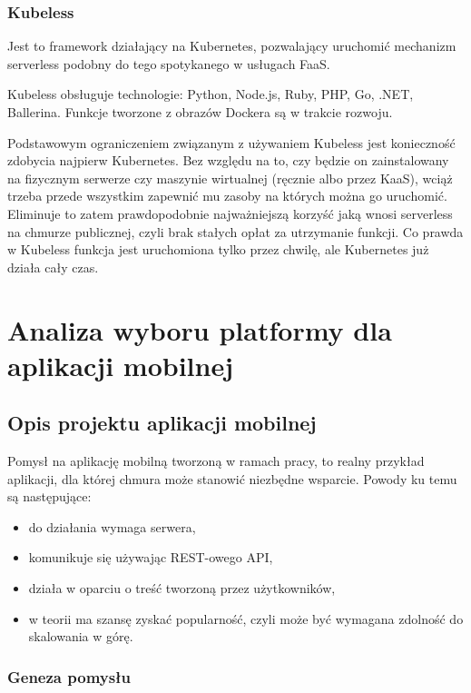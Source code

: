 \documentclass[12pt,a4paper,twoside,titlepage,openright]{book}
\begin{document}
\subsection{Kubeless}

Jest to framework działający na Kubernetes, pozwalający uruchomić mechanizm serverless podobny do tego spotykanego w usługach FaaS. \cite{distributedSystems} 

Kubeless obsługuje technologie: Python, Node.js, Ruby, PHP, Go, .NET, Ballerina. Funkcje tworzone z obrazów Dockera są w trakcie rozwoju.

Podstawowym ograniczeniem związanym z używaniem Kubeless jest konieczność zdobycia najpierw Kubernetes. Bez względu na to, czy będzie on zainstalowany na fizycznym serwerze czy maszynie wirtualnej (ręcznie albo przez KaaS), wciąż trzeba przede wszystkim zapewnić mu zasoby na których można go uruchomić. Eliminuje to zatem prawdopodobnie najważniejszą korzyść jaką wnosi serverless na chmurze publicznej, czyli brak stałych opłat za utrzymanie funkcji. Co prawda w Kubeless funkcja jest uruchomiona tylko przez chwilę, ale Kubernetes już działa cały czas.


\chapter{Analiza wyboru platformy dla aplikacji mobilnej}

\section{Opis projektu aplikacji mobilnej}

Pomysł na aplikację mobilną tworzoną w ramach pracy, to realny przykład aplikacji, dla której chmura może stanowić niezbędne wsparcie. Powody ku temu są następujące:
\begin{itemize}
\item do działania wymaga serwera,
\item komunikuje się używając REST-owego API,
\item działa w oparciu o treść tworzoną przez użytkowników,
\item w teorii ma szansę zyskać popularność, czyli może być wymagana zdolność do skalowania w górę.
\end{itemize}

\subsection{Geneza pomysłu}\label{section:genezaPomyslu}
\end{document}
